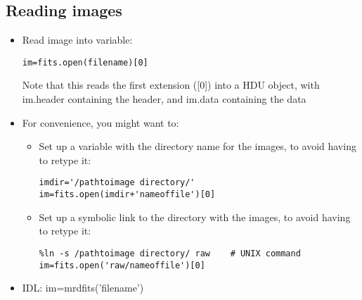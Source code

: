 \documentclass{article}
\begin{document}
\subsection*{Reading images}
\begin{itemize}
\item Read image into variable:
\begin{verbatim}
im=fits.open(filename)[0]
\end{verbatim}
Note that this reads the first extension ([0]) into a HDU object, with
im.header containing the header, and im.data containing the data
\item For convenience, you might want to:
\begin{itemize}
\item Set up a variable with the directory name for the images,
to avoid having to retype it:
\begin{verbatim}
imdir='/pathtoimage directory/'
im=fits.open(imdir+'nameoffile')[0]
\end{verbatim}
\item Set up a symbolic link to the directory with the images,
to avoid having to retype it:
\begin{verbatim}
%ln -s /pathtoimage directory/ raw    # UNIX command
im=fits.open('raw/nameoffile')[0]
\end{verbatim}
\end{itemize}
\item IDL: im=mrdfits('filename')
\end{itemize}
\end{document}
